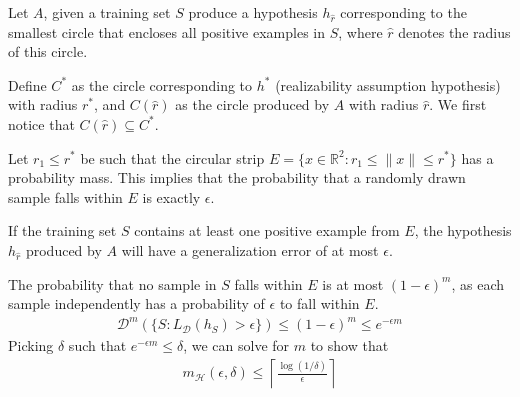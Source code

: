 \documentclass[10pt]{article}
\newenvironment{problem}[2][Problem]{\begin{trivlist}
\item[\hskip \labelsep {\bfseries #1}\hskip \labelsep {\bfseries #2.}]}{\end{trivlist}}
\begin{document}
\begin{problem}{3}

Let \(A\), given a training set \(S\) produce a hypothesis \(h_{\hat{r}}\) corresponding to the smallest circle that encloses all positive examples in \(S\), where \(\hat{r}\) denotes the radius of this circle.

Define \(C^*\) as the circle corresponding to \(h^*\) (realizability assumption hypothesis) with radius \(r^*\), and \(C(\hat{r})\) as the circle produced by \(A\) with radius \(\hat{r}\). We first notice that \(C(\hat{r}) \subseteq C^*\).

Let \(r_1 \leq r^*\) be such that the circular strip \(E = \{x \in \mathbb{R}^2 : r_1 \leq \|x\| \leq r^*\}\) has a probability mass. This implies that the probability that a randomly drawn sample falls within \(E\) is exactly \(\epsilon\).

If the training set \(S\) contains at least one positive example from \(E\), the hypothesis \(h_{\hat{r}}\) produced by \(A\) will have a generalization error of at most \(\epsilon\).

The probability that no sample in \(S\) falls within \(E\) is at most \((1 - \epsilon)^m\), as each sample independently has a probability of \(\epsilon\) to fall within \(E\).
            \begin{align*}
                \mathcal{D}^m(\{S : L_{\mathcal{D}}(h_S) > \epsilon\}) \leq (1 - \epsilon)^m \leq e^{-\epsilon m}
            \end{align*}
            Picking $\delta$ such that $e^{-\epsilon m} \leq \delta$, we can solve for $m$ to show that 
            \begin{align*}
                m_\mathcal{H}(\epsilon, \delta) \leq \left\lceil\frac{\log(1/\delta)}{\epsilon}\right\rceil
            \end{align*}

\end{problem}
\end{document}
